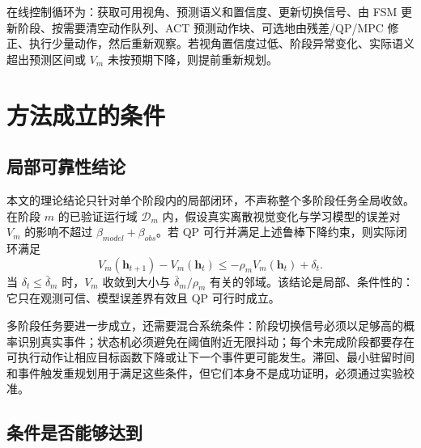 \documentclass[UTF8,a4paper,11pt]{ctexart}
\begin{document}
在线控制循环为：获取可用视角、预测语义和置信度、更新切换信号、由 FSM 更新阶段、按需要清空动作队列、ACT 预测动作块、可选地由残差/QP/MPC 修正、执行少量动作，然后重新观察。若视角置信度过低、阶段异常变化、实际语义超出预测区间或 $V_m$ 未按预期下降，则提前重新规划。

\section{方法成立的条件}

\subsection{局部可靠性结论}

本文的理论结论只针对单个阶段内的局部闭环，不声称整个多阶段任务全局收敛。在阶段 $m$ 的已验证运行域 $\mathcal D_m$ 内，假设真实离散视觉变化与学习模型的误差对 $V_m$ 的影响不超过 $\beta_{model}+\beta_{obs}$。若 QP 可行并满足上述鲁棒下降约束，则实际闭环满足
\begin{equation}
V_m(\bm h_{t+1})-V_m(\bm h_t)
\leq-\rho_mV_m(\bm h_t)+\delta_t.
\end{equation}
当 $\delta_t\leq\bar\delta_m$ 时，$V_m$ 收敛到大小与 $\bar\delta_m/\rho_m$ 有关的邻域。该结论是局部、条件性的：它只在观测可信、模型误差界有效且 QP 可行时成立。

多阶段任务要进一步成立，还需要混合系统条件：阶段切换信号必须以足够高的概率识别真实事件；状态机必须避免在阈值附近无限抖动；每个未完成阶段都要存在可执行动作让相应目标函数下降或让下一个事件更可能发生。滞回、最小驻留时间和事件触发重规划用于满足这些条件，但它们本身不是成功证明，必须通过实验校准。

\subsection{条件是否能够达到}
\end{document}
